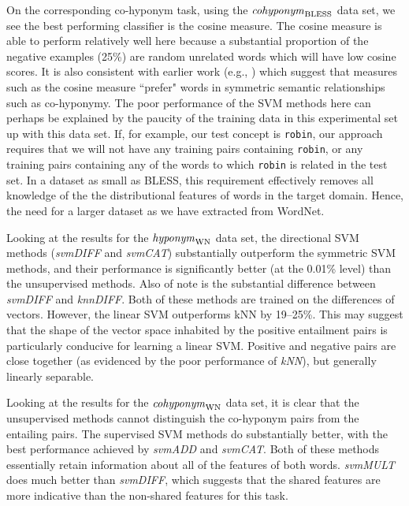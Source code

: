 \documentclass[11pt]{article}
\newcommand\coordBLESS{\mbox{\em cohyponym\/}_{\mbox{\scriptsize BLESS}}}
\newcommand\entWN{\mbox{\em hyponym\/}_{\mbox{\scriptsize WN}}}
\newcommand\coordWN{\mbox{\em cohyponym\/}_{\mbox{\scriptsize WN}}}
\begin{document}
On the corresponding co-hyponym task, using the $\coordBLESS$ data set, we see the best performing classifier is the cosine measure. The cosine measure is able to perform relatively well here because a substantial proportion of the negative examples (25\%) are random unrelated words which will have low cosine scores.  It is also consistent with earlier work (e.g., \cite{Lenci2012}) which suggest that measures such as the cosine measure ``prefer" words in symmetric semantic relationships such as co-hyponymy.  The poor performance of the SVM methods here can perhaps be explained by the paucity of the training data in this experimental set up with this data set.  If, for example, our test concept is \texttt{robin}, our approach requires that we will not have any training pairs containing \texttt{robin}, or any training pairs containing any of the words to which \texttt{robin} is related in the test set.  In a dataset as small as BLESS, this requirement effectively removes all knowledge of the the distributional features of words in the target domain.  Hence, the need for a larger dataset as we have extracted from WordNet.

Looking at the results for the $\entWN$ data set, the directional SVM methods (\emph{svmDIFF} and \emph{svmCAT})  substantially outperform the symmetric SVM methods, and their performance is significantly better (at the 0.01\% level) than the unsupervised methods.  Also of note is the substantial difference between \emph{svmDIFF} and \emph{knnDIFF}.  Both of these methods are trained on the differences of vectors.  However, the linear SVM outperforms kNN by 19--25\%.  This may suggest that the shape of the vector space inhabited by the positive entailment pairs is particularly conducive for learning a linear SVM.  Positive and negative pairs are close together (as evidenced by the poor performance of \emph{kNN}), but generally linearly separable.

Looking at the results for the $\coordWN$ data set, it is clear that the unsupervised methods cannot distinguish the co-hyponym pairs from the entailing pairs.  The supervised SVM methods do substantially better, with the best performance achieved by \emph{svmADD} and \emph{svmCAT}.  Both of these methods essentially retain information about all of the features of both words.  \emph{svmMULT} does much better than \emph{svmDIFF}, which suggests that the shared features are more indicative than the non-shared features for this task. 
\end{document}
